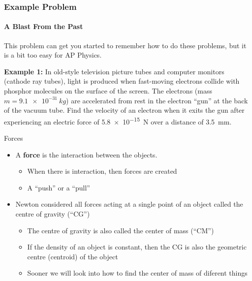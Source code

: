 \documentclass[12pt,compress,aspectratio=169]{beamer}
\begin{document}
\begin{frame}
  \frametitle{Example Problem}
  \framesubtitle{A Blast From the Past}
  This problem can get you started to remember how to do these problems, but it
  is a bit too easy for AP Physics.
  
  \vspace{.2in}\textbf{Example 1:} In old-style television picture tubes and
  computer monitors (cathode ray tubes), light is produced when fast-moving
  electrons collide with phosphor molecules on the surface of the screen. The
  electrons (mass $m=\SI{9.1e-31}{kg}$) are accelerated from rest in the
  electron ``gun'' at the back of the vacuum tube. Find the velocity of an
  electron when it exits the gun after experiencing an electric force of
  \SI{5.8e-15}{N} over a distance of \SI{3.5}{mm}.
\end{frame}



\begin{frame}{Forces}
  \begin{itemize}
  \item A \textbf{force} is the interaction between the objects.
    \begin{itemize}
    \item When there is interaction, then forces are created
    \item A ``push'' or a ``pull''
    \end{itemize}

  \item Newton considered all forces acting at a single point of an object
    called the centre of gravity (``CG'')
    \begin{itemize}
    \item The centre of gravity is also called the center of mass (``CM'')
    \item If the density of an object is constant, then the CG is also the
      geometric centre (centroid) of the object
    \item Sooner we will look into how to find the center of mass of diferent
      things
    \end{itemize}
  \end{itemize}
\end{frame}
\end{document}
